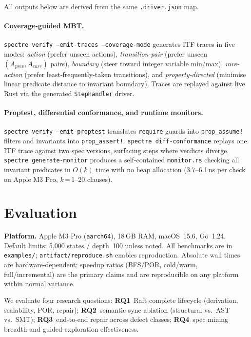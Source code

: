 \documentclass[runningheads]{../paper-vmcai-2027/llncs}
\begin{document}
All outputs below are derived from the same \texttt{.driver.json} map.

\paragraph{Coverage-guided MBT.}
\texttt{spectre verify --emit-traces --coverage-mode} generates ITF traces
in five modes: \emph{action} (prefer unseen actions),
\emph{transition-pair} (prefer unseen $(A_{\mathit{prev}},A_{\mathit{curr}})$ pairs),
\emph{boundary} (steer toward integer variable min/max),
\emph{rare-action} (prefer least-frequently-taken transitions), and
\emph{property-directed} (minimise linear predicate distance to invariant
boundary).
Traces are replayed against live Rust via the generated \texttt{StepHandler} driver.

\paragraph{Proptest, differential conformance, and runtime monitors.}
\texttt{spectre verify --emit-proptest} translates \texttt{require} guards
into \texttt{prop\_assume!} filters and invariants into \texttt{prop\_assert!}.
\texttt{spectre diff-conformance} replays one ITF trace against two spec
versions, surfacing steps where verdicts diverge.
\texttt{spectre generate-monitor} produces a self-contained \texttt{monitor.rs}
checking all invariant predicates in $O(k)$ time with no heap allocation
(3.7--6.1\,ns per check on Apple M3 Pro, $k$\,=\,1--20 clauses).

\section{Evaluation}\label{sec:eval}

\noindent\textbf{Platform.}
Apple M3 Pro (\texttt{aarch64}), 18\,GB RAM, macOS~15.6, Go~1.24.
Default limits: 5{,}000 states / depth~100 unless noted.
All benchmarks are in \texttt{examples/}; \texttt{artifact/reproduce.sh} enables reproduction.
Absolute wall times are hardware-dependent; speedup ratios (BFS/POR,
cold/warm, full/incremental) are the primary claims and are
reproducible on any platform within normal variance.

We evaluate four research questions:
\textbf{RQ1}~Raft complete lifecycle (derivation, scalability, POR, repair);
\textbf{RQ2}~semantic sync ablation (structural vs.\ AST vs.\ SMT);
\textbf{RQ3}~end-to-end repair across defect classes;
\textbf{RQ4}~spec mining breadth and guided-exploration effectiveness.
\end{document}
